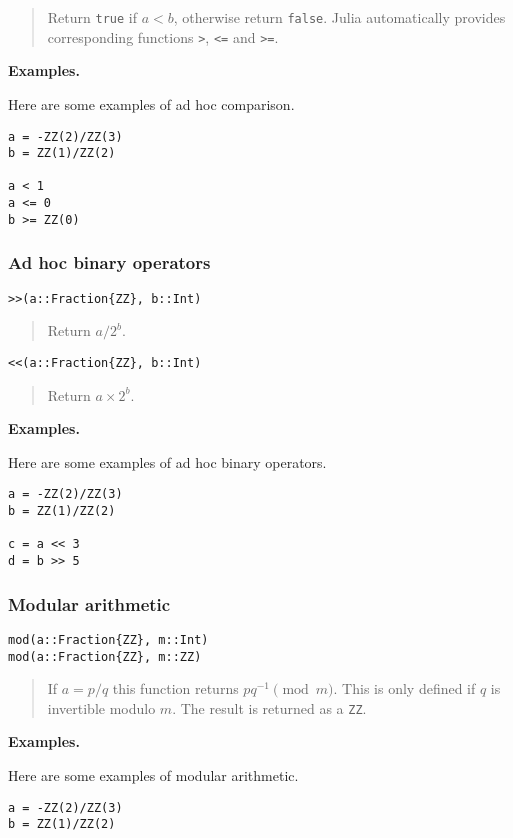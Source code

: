 \documentclass[a4paper,10pt]{article}
\newcommand{\code}{\lstinline}
\newcommand{\desc}[1]{\vspace{-3mm}\begin{quote}#1\end{quote}}
\begin{document}
{{{\desc{Return \code{true} if $a < b$, otherwise return \code{false}. Julia
automatically provides corresponding functions \code{>}, \code{<=} and
\code{>=}.}

\textbf{Examples.}

Here are some examples of ad hoc comparison.

\begin{lstlisting}
a = -ZZ(2)/ZZ(3)
b = ZZ(1)/ZZ(2)

a < 1
a <= 0
b >= ZZ(0)
\end{lstlisting}

\subsubsection{Ad hoc binary operators}

\begin{lstlisting}
>>(a::Fraction{ZZ}, b::Int)
\end{lstlisting}

\desc{Return $a/2^b$.}

\begin{lstlisting}
<<(a::Fraction{ZZ}, b::Int)
\end{lstlisting}

\desc{Return $a\times 2^b$.}

\textbf{Examples.}

Here are some examples of ad hoc binary operators.

\begin{lstlisting}
a = -ZZ(2)/ZZ(3)
b = ZZ(1)/ZZ(2)

c = a << 3
d = b >> 5
\end{lstlisting}

\subsubsection{Modular arithmetic}

\begin{lstlisting}
mod(a::Fraction{ZZ}, m::Int)
mod(a::Fraction{ZZ}, m::ZZ)
\end{lstlisting}

\desc{If $a = p/q$ this function returns $pq^{-1} \pmod{m}$. This is only
defined if $q$ is invertible modulo $m$. The result is returned as a \code{ZZ}.}

\textbf{Examples.}

Here are some examples of modular arithmetic.

\begin{lstlisting}
a = -ZZ(2)/ZZ(3)
b = ZZ(1)/ZZ(2)


\end{lstlisting}}}}
\end{document}
